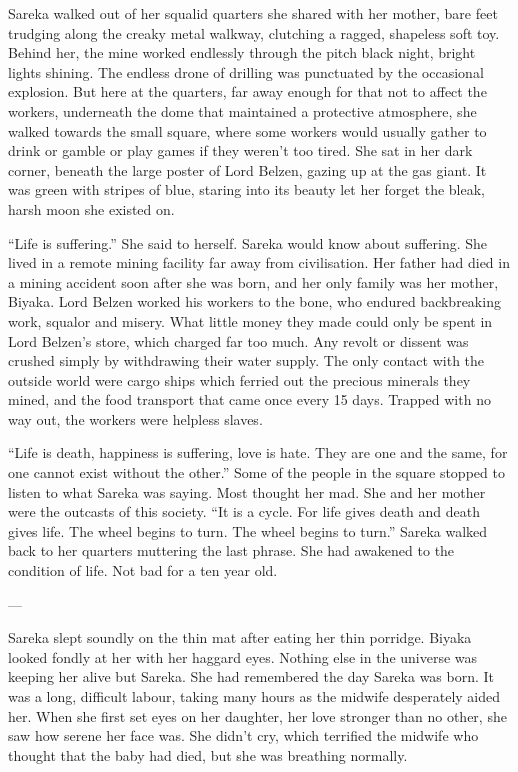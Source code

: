 Sareka walked out of her squalid quarters she shared with her mother, bare feet trudging along the creaky metal walkway, clutching a ragged, shapeless soft toy. Behind her, the mine worked endlessly through the pitch black night, bright lights shining. The endless drone of drilling was punctuated by the occasional explosion. But here at the quarters, far away enough for that not to affect the workers, underneath the dome that maintained a protective atmosphere, she walked towards the small square, where some workers would usually gather to drink or gamble or play games if they weren’t too tired. She sat in her dark corner, beneath the large poster of Lord Belzen, gazing up at the gas giant. It was green with stripes of blue, staring into its beauty let her forget the bleak, harsh moon she existed on.

“Life is suffering.” She said to herself. Sareka would know about suffering. She lived in a remote mining facility far away from civilisation. Her father had died in a mining accident soon after she was born, and her only family was her mother, Biyaka. Lord Belzen worked his workers to the bone, who endured backbreaking work, squalor and misery. What little money they made could only be spent in Lord Belzen’s store, which charged far too much. Any revolt or dissent was crushed simply by withdrawing their water supply. The only contact with the outside world were cargo ships which ferried out the precious minerals they mined, and the food transport that came once every 15 days. Trapped with no way out, the workers were helpless slaves.

“Life is death, happiness is suffering, love is hate. They are one and the same, for one cannot exist without the other.” Some of the people in the square stopped to listen to what Sareka was saying. Most thought her mad. She and her mother were the outcasts of this society. “It is a cycle. For life gives death and death gives life. The wheel begins to turn. The wheel begins to turn.” Sareka walked back to her quarters muttering the last phrase. She had awakened to the condition of life. Not bad for a ten year old.

---

Sareka slept soundly on the thin mat after eating her thin porridge. Biyaka looked fondly at her with her haggard eyes. Nothing else in the universe was keeping her alive but Sareka. She had remembered the day Sareka was born. It was a long, difficult labour, taking many hours as the midwife desperately aided her. When she first set eyes on her daughter, her love stronger than no other, she saw how serene her face was. She didn’t cry, which terrified the midwife who thought that the baby had died, but she was breathing normally.

